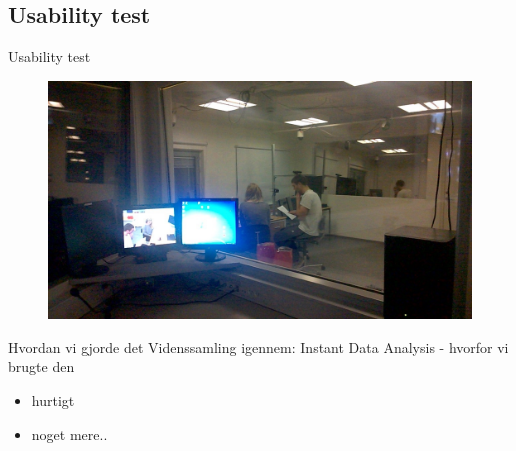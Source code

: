 \subsection{Usability test}
\begin{frame}{Usability test}
	\begin{figure}
		\centering
		\includegraphics[width=\textwidth]{slides/Heider/subjectRoom}
	\end{figure}
	Hvordan vi gjorde det
	Videnssamling igennem: Instant Data Analysis - hvorfor vi brugte den
	\begin{itemize}
		\item hurtigt
		\item noget mere..
	\end{itemize}
\end{frame}
